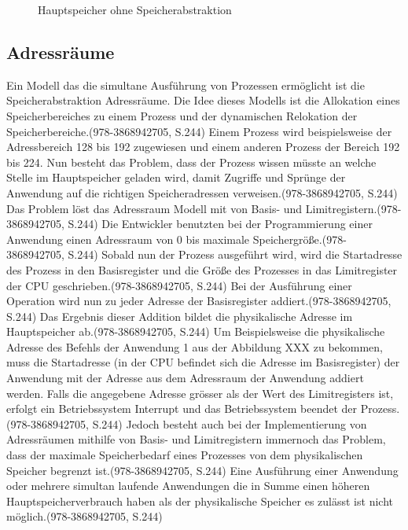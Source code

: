 \begin{figure}[htb]
	\centering
	\caption{Hauptspeicher ohne Speicherabstraktion}
\end{figure}


\subsection{Adressr\"{a}ume}
\label{subsec:Adressraeume}
Ein Modell das die simultane Ausführung von Prozessen ermöglicht ist die Speicherabstraktion Adressräume. Die Idee dieses Modells ist die Allokation eines Speicherbereiches zu einem Prozess und der dynamischen Relokation der Speicherbereiche.(978-3868942705, S.244) Einem Prozess wird beispielsweise der Adressbereich 128 bis 192 zugewiesen und einem anderen Prozess der Bereich 192 bis 224. Nun besteht das Problem, dass der Prozess wissen müsste an welche Stelle im Hauptspeicher geladen wird, damit Zugriffe und Sprünge der Anwendung auf die richtigen Speicheradressen verweisen.(978-3868942705, S.244) Das Problem löst das Adressraum Modell mit von Basis- und Limitregistern.(978-3868942705, S.244) Die Entwickler benutzten bei der Programmierung einer Anwendung einen Adressraum von 0 bis maximale Speichergröße.(978-3868942705, S.244) Sobald nun der Prozess ausgeführt wird, wird die Startadresse des Prozess in den Basisregister und die Größe des Prozesses in das Limitregister der CPU geschrieben.(978-3868942705, S.244) Bei der Ausführung einer Operation wird nun zu jeder Adresse der Basisregister addiert.(978-3868942705, S.244) Das Ergebnis dieser Addition bildet die physikalische Adresse im Hauptspeicher ab.(978-3868942705, S.244) Um Beispielsweise die physikalische Adresse des Befehls der Anwendung 1 aus der Abbildung XXX zu bekommen, muss die Startadresse (in der CPU befindet sich die Adresse im Basisregister) der Anwendung mit der Adresse aus dem Adressraum der Anwendung addiert werden. Falls die angegebene Adresse grösser als der Wert des Limitregisters ist, erfolgt ein Betriebssystem Interrupt und das Betriebssystem beendet der Prozess.(978-3868942705, S.244) Jedoch besteht auch bei der Implementierung von Adressräumen mithilfe von Basis- und Limitregistern immernoch das Problem, dass der maximale Speicherbedarf eines Prozesses von dem physikalischen Speicher begrenzt ist.(978-3868942705, S.244) Eine Ausführung einer Anwendung oder mehrere simultan laufende Anwendungen die in Summe einen höheren Hauptspeicherverbrauch haben als der physikalische Speicher es zulässt ist nicht möglich.(978-3868942705, S.244)

